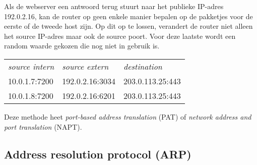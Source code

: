 \begin{enumerate}
\begin{center}
\begin{tabular}{lll}
   \end{tabular}
   \end{center}
   Als de webserver een antwoord terug stuurt naar het publieke IP-adres 192.0.2.16, kan de router op geen enkele manier bepalen op de pakketjes voor de eerste of de tweede host zijn.
   Op dit op te lossen, verandert de router niet alleen het source IP-adres maar ook de source poort.
   Voor deze laatste wordt een random waarde gekozen die nog niet in gebruik is.
   \begin{center}
   \begin{tabular}{lll}
   \textit{source intern} & \textit{source extern} & \textit{destination} \\[1ex]
   10.0.1.7:7200          & 192.0.2.16:3034        & 203.0.113.25:443 \\
   10.0.1.8:7200          & 192.0.2.16:6201        & 203.0.113.25:443 \\
   \end{tabular}
   \end{center}
   Deze methode heet \emph{port-based address translation} (PAT) of \emph{network address and port translation} (NAPT).
\end{enumerate}



\subsection{Address resolution protocol (ARP)}
\label{sec:arp}


